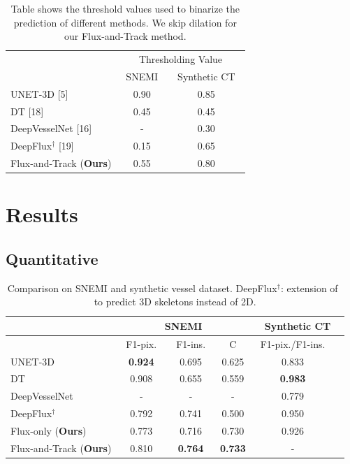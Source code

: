 \begin{table}[htpb]
	\centering
	\caption{\label{tab:baseline_params}Table shows the threshold values used to binarize the prediction of different methods. We skip dilation for our Flux-and-Track method.}
	\begin{tabular}{l|cc}
		& \multicolumn{2}{c}{Thresholding Value}\\
		&~SNEMI~&~Synthetic CT~ \\
		\hline
		UNET-3D [5]           &  0.90 & 0.85\\
		DT [18]                 &  0.45 & 0.45\\
		DeepVesselNet [16]        &  -    & 0.30\\
		DeepFlux$^{\dagger}$ [19]   & 0.15  & 0.65\\
		Flux-and-Track (\textbf{Ours})         & 0.55  & 0.80 \\
		\hline
	\end{tabular}
\end{table}

\section{Results}

\subsection{Quantitative}

\begin{table}[htpb]
	\caption{\label{tab:exp_em}Comparison on SNEMI and synthetic vessel dataset. DeepFlux$^{\dagger}$: extension of~\cite{Wang2019} to predict 3D skeletons instead of 2D.}
	\centering
	\begin{tabular}{lccc|cc}
		& \multicolumn{3}{c}{SNEMI} & \multicolumn{2}{c}{Synthetic CT}\\
		\hline
		& ~F1-pix.~&~F1-ins.~&~C~&~F1-pix./F1-ins.~ \\\hline
		UNET-3D~\cite{cciccek20163d}           & \textbf{0.924}  & 0.695 & 0.625  & 0.833\\
		DT~\cite{wang2019deep}                 & 0.908  & 0.655 & 0.559  & \textbf{0.983}\\
		DeepVesselNet~\cite{Tetteh2018}        & -      & -     &  -     & 0.779\\
		DeepFlux$^{\dagger}$~\cite{Wang2019}   & 0.792  & 0.741 & 0.500  & 0.950\\\hline
		Flux-only (\textbf{Ours})              &    0.773   & 0.716 & 0.730  & 0.926\\
		Flux-and-Track (\textbf{Ours})  & 0.810 & \textbf{0.764} & \textbf{0.733} & - \\
		\hline
	\end{tabular}
\end{table}

